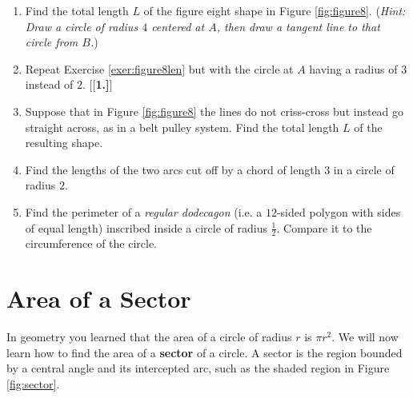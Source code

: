{\begin{enumerate}[\bfseries 1.]
{}
 \item\label{exer:figure8len} Find the total length $L$ of the figure eight shape in Figure
  \ref{fig:figure8}. (\emph{Hint: Draw a circle of radius $4$ centered at $A$, then draw a tangent
  line to that circle from $B$.})
 \item Repeat Exercise \ref{exer:figure8len} but with the circle at $A$ having a radius of $3$
  instead of $2$.
[{[\bfseries 1.]}]
 \item Suppose that in Figure \ref{fig:figure8} the lines do not criss-cross but instead go
  straight across, as in a belt pulley system. Find the total length $L$ of the resulting shape.
 \item Find the lengths of the two arcs cut off by a chord of length $3$ in a circle of radius $2$.
 \item Find the perimeter of a \emph{regular dodecagon} (i.e. a $12$-sided polygon
  with sides of equal length) inscribed inside a circle of radius $\frac{1}{2}$. Compare it to the
  circumference of the circle.
\end{enumerate}}

\newpage
\section{Area of a Sector}
\piccaption[]{\label{fig:sector}}
In geometry you learned that the area of a circle of radius $r$ is $\pi r^2$. We will now learn
how to find the area of a \textbf{sector} of a circle. A sector
is the region bounded by a central angle and its intercepted arc, such as the shaded region in
Figure \ref{fig:sector}.

